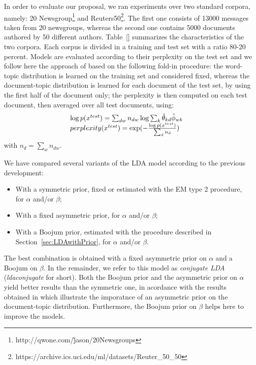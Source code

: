 In order to evaluate our proposal, we ran experiments over two standard corpora, namely: 20 Newsgroup\footnote{http://qwone.com/\~jason/20Newsgroups} and Reuters50\footnote{https://archive.ics.uci.edu/ml/datasets/Reuter\_50\_50}. The first one consists of 13000 messages taken from 20 newsgroups, whereas the second one contains 5000 documents authored by 50 different authors. Table~\ref{} summarizes the characteristics of the two corpora. Each corpus is divided in a training and test set with a ratio 80-20 percent. Models are evaluated according to their perplexity on the test set and we follow here the  approach of \cite{asuncion_smoothing_2009} based on the following fold-in procedure: the word-topic distribution is learned on the training set and considered fixed, whereas the document-topic distribution is learned for each document of the test set, by using the first half of the document only; the perplexity is then computed on each test document, then averaged over all test documents, using:
%
\[
\begin{array}{l@{\hspace{.3cm}}l}
\log p(x^{test}) = \sum_{dw} n_{dw} \log \sum_k \hat{\theta}_{kd} \hat{\phi}_{wk} \\
perplexity(x^{test}) = \exp(- \frac{\log p(x^{test})}{\sum_d n_d})
\end{array}
\]
%
with $n_d = \sum_w n_{dw}$.

We have compared several variants of the LDA model according to the previous development:
%
\begin{itemize}
\item With a symmetric prior, fixed or estimated with the EM type 2 procedure, for $\alpha$ and/or $\beta$;
\item With a fixed asymmetric prior, for $\alpha$ and/or $\beta$;
\item With a Boojum prior, estimated with the procedure described in Section~\ref{sec:LDAwithPrior}, for $\alpha$ and/or $\beta$.
\end{itemize}
%
The best combination is obtained with a fixed asymmetric prior on $\alpha$ and a Boojum on $\beta$. In the remainder, we refer to this model as {\it conjugate LDA} ({\it ldaconjugate} for short). Both the Boojum prior and the asymmetric prior on $\alpha$ yield better results than the symmetric one, in acordance with the results obtained in \cite{wallach_rethinking_2009} which illustrate the imporatnce of an asymmetric prior on the document-topic distribution. Furthermore, the Boojum prior on $\beta$ helps here to improve the models.

